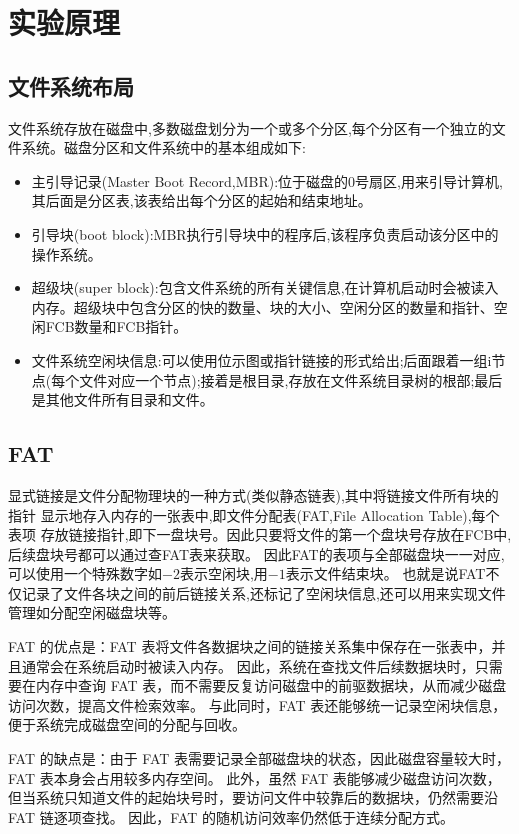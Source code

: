 \section{实验原理}

\subsection{文件系统布局}
文件系统存放在磁盘中,多数磁盘划分为一个或多个分区,每个分区有一个独立的文件系统。磁盘分区和文件系统中的基本组成如下:
\begin{itemize}
    \item 主引导记录(Master Boot Record,MBR):位于磁盘的0号扇区,用来引导计算机,其后面是分区表,该表给出每个分区的起始和结束地址。
    \item 引导块(boot block):MBR执行引导块中的程序后,该程序负责启动该分区中的操作系统。
    \item 超级块(super block):包含文件系统的所有关键信息,在计算机启动时会被读入内存。超级块中包含分区的快的数量、块的大小、空闲分区的数量和指针、空闲FCB数量和FCB指针。
    \item 文件系统空闲块信息:可以使用位示图或指针链接的形式给出;后面跟着一组i节点(每个文件对应一个节点);接着是根目录,存放在文件系统目录树的根部;最后是其他文件所有目录和文件。
\end{itemize}

\subsection{FAT}
显式链接是文件分配物理块的一种方式(类似静态链表),其中将链接文件所有块的指针
显示地存入内存的一张表中,即文件分配表(FAT,File Allocation Table),每个表项
存放链接指针,即下一盘块号。因此只要将文件的第一个盘块号存放在FCB中,后续盘块号都可以通过查FAT表来获取。
因此FAT的表项与全部磁盘块一一对应,可以使用一个特殊数字如$-2$表示空闲块,用$-1$表示文件结束块。
也就是说FAT不仅记录了文件各块之间的前后链接关系,还标记了空闲块信息,还可以用来实现文件管理如分配空闲磁盘块等。


FAT 的优点是：FAT 表将文件各数据块之间的链接关系集中保存在一张表中，并且通常会在系统启动时被读入内存。
因此，系统在查找文件后续数据块时，只需要在内存中查询 FAT 表，而不需要反复访问磁盘中的前驱数据块，从而减少磁盘访问次数，提高文件检索效率。
与此同时，FAT 表还能够统一记录空闲块信息，便于系统完成磁盘空间的分配与回收。

FAT 的缺点是：由于 FAT 表需要记录全部磁盘块的状态，因此磁盘容量较大时，FAT 表本身会占用较多内存空间。
此外，虽然 FAT 表能够减少磁盘访问次数，但当系统只知道文件的起始块号时，要访问文件中较靠后的数据块，仍然需要沿 FAT 链逐项查找。
因此，FAT 的随机访问效率仍然低于连续分配方式。


